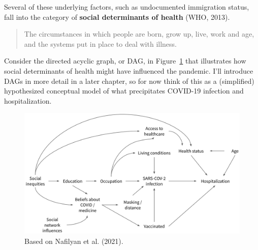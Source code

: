 \documentclass[
  letterpaper,
  DIV=11,
  numbers=noendperiod,
  oneside]{scrreprt}
\begin{document}
Several of these underlying factors, such as undocumented immigration
status, fall into the category of \textbf{social determinants of health}
(WHO,
2013).

\begin{quote}
The circumstances in which people are born, grow up, live, work and age,
and the systems put in place to deal with illness.
\end{quote}

Consider the directed acyclic graph, or DAG, in
Figure~\ref{fig-coviddag} that illustrates how social determinants of
health might have influenced the pandemic. I'll introduce DAGs in more
detail in a later chapter, so for now think of this as a (simplified)
hypothesized conceptual model of what precipitates COVID-19 infection
and hospitalization.

\begin{figure}[h]

{\centering \includegraphics{./images/covid_dag.png}

}

\caption{\label{fig-coviddag}Based on Nafilyan et al.
(2021)\protect{}.}

\end{figure}
\end{document}

